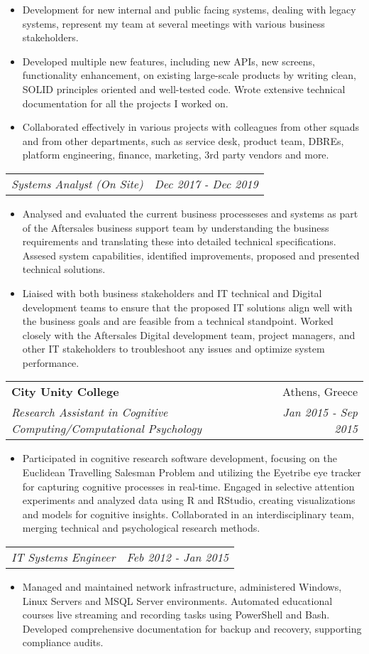 \documentclass[letterpaper,11pt]{article}
\makeatletter
\newcommand{\resumeItem}[1]{
  \item\small{
    {#1 \vspace{-1pt}}
  }
}
\newcommand{\resumeSubheading}[4]{
  \item
    \begin{tabular*}{0.97\textwidth}[t]{l@{\extracolsep{\fill}}r}
      \textbf{#1} & #2 \\
      \textit{\small#3} & \textit{\small #4} \\
    \end{tabular*}\vspace{1mm}
}
\newcommand{\resumeSubSubheading}[2]{
    \item
    \begin{tabular*}{0.97\textwidth}{l@{\extracolsep{\fill}}r}
      \textit{\small#1} & \textit{\small #2} \\
    \end{tabular*}\vspace{1mm}
}
\newcommand{\resumeItemListStart}{\begin{itemize}}
\newcommand{\resumeItemListEnd}{\end{itemize}\vspace{-5pt}}
\makeatother
\begin{document}
     \resumeItemListStart
       \resumeItem{}
        {Development for new internal and public facing systems, dealing with legacy systems, represent my team at several meetings with various business stakeholders.}
        \resumeItem{}
        {Developed multiple new features, including new APIs, new screens, functionality enhancement, on existing large-scale products by writing clean, SOLID principles oriented and well-tested code. Wrote extensive technical documentation for all the projects I worked on.}
        \resumeItem{}
        {Collaborated effectively in various projects with colleagues from other squads and from other departments, such as service desk, product team, DBREs, platform engineering, finance, marketing, 3rd party vendors and more.}
        \resumeItemListEnd
        \resumeSubSubheading
     {Systems Analyst (On Site)}{Dec 2017 - Dec 2019}
     \resumeItemListStart
        \resumeItem{}
          {Analysed and evaluated the current business processeses and systems as part of the Aftersales business support team by understanding the business requirements and translating these into 
          detailed technical specifications. Assesed system capabilities, identified improvements, proposed and presented technical solutions.}
          \resumeItem{}
          {Liaised with both business stakeholders and IT technical and Digital development teams to ensure that the proposed IT solutions align well with the business goals and are feasible from a technical standpoint. 
          Worked closely with the Aftersales Digital development team, project managers, and other IT stakeholders to troubleshoot any issues and optimize system performance.}
     \resumeItemListEnd
     \vspace{3mm}

    \resumeSubheading
      {City Unity College}{Athens, Greece}
      {Research Assistant in Cognitive Computing/Computational Psychology}{Jan 2015 - Sep 2015}
      \resumeItemListStart
      \resumeItem{}
      {Participated in cognitive research software development, focusing on the Euclidean Travelling Salesman Problem and utilizing the Eyetribe eye tracker for capturing cognitive processes in real-time. Engaged in selective attention experiments and analyzed data using R and RStudio, creating visualizations and models for cognitive insights. Collaborated in an interdisciplinary team, merging technical and psychological research methods.}
      \resumeItemListEnd
      \vspace{3mm}

    \resumeSubSubheading
      {IT Systems Engineer}{Feb 2012 - Jan 2015}
      \resumeItemListStart
      \resumeItem{}
      {Managed and maintained network infrastructure, administered Windows, Linux Servers and MSQL Server environments. Automated educational courses live streaming and recording tasks using PowerShell and Bash. Developed comprehensive documentation for backup and recovery, supporting compliance audits.}
      \resumeItemListEnd
\end{document}
